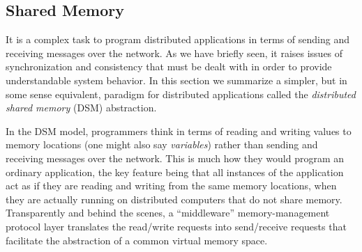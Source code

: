 \documentclass[]             %
{NASA}                       %
\theoremstyle{definition}
\begin{document}
\subsection{Shared Memory}
It is a complex task to program distributed applications in terms of
sending and receiving messages over the network. As we have briefly
seen, it raises issues of synchronization and consistency that must be
dealt with in order to provide understandable system behavior. In this
section we summarize a simpler, but in some sense equivalent, paradigm
for distributed applications called the \emph{distributed shared
memory} (DSM) abstraction.

In the DSM model, programmers think in terms of reading and writing
values to memory locations (one might also say \emph{variables})
rather than sending and receiving messages over the network. This is
much how they would program an ordinary application, the key feature
being that all instances of the application act as if they are reading
and writing from the same memory locations, when they are actually
running on distributed computers that do not share
memory. Transparently and behind the scenes, a ``middleware''
memory-management protocol layer translates the read/write requests
into send/receive requests that facilitate the abstraction of a common
virtual memory space.


\end{document}

